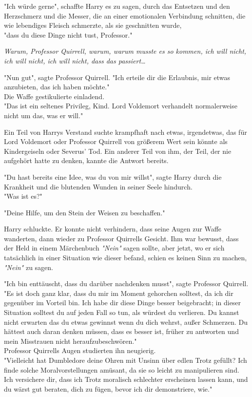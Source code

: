 {"Ich würde gerne", schaffte Harry es zu sagen, durch das Entsetzen und den Herzschmerz und die Messer, die an einer emotionalen Verbindung schnitten, die wie lebendiges Fleisch schmerzte, als sie geschnitten wurde,\\ "dass du diese Dinge nicht tust, Professor."

\emph{Warum, Professor Quirrell, warum, warum musste es so kommen, ich will nicht, ich will nicht, ich will nicht, dass das passiert…}

"Nun gut", sagte Professor Quirrell. "Ich erteile dir die Erlaubnis, mir etwas anzubieten, das ich haben möchte."\\ Die Waffe gestikulierte einladend.\\ "Das ist ein seltenes Privileg, Kind. Lord Voldemort verhandelt normalerweise nicht um das, was er will."

Ein Teil von Harrys Verstand suchte krampfhaft nach etwas, irgendetwas, das für Lord Voldemort oder Professor Quirrell von größerem Wert sein könnte als Kindergeiseln oder Severus' Tod. Ein anderer Teil von ihm, der Teil, der nie aufgehört hatte zu denken, kannte die Antwort bereits.

"Du hast bereits eine Idee, was du von mir willst", sagte Harry durch die Krankheit und die blutenden Wunden in seiner Seele hindurch.\\ "Was ist es?"

"Deine Hilfe, um den Stein der Weisen zu beschaffen."

Harry schluckte. Er konnte nicht verhindern, dass seine Augen zur Waffe wanderten, dann wieder zu Professor Quirrells Gesicht. Ihm war bewusst, dass der Held in einem Märchenbuch \emph{"Nein"} sagen sollte, aber jetzt, wo er sich tatsächlich in einer Situation wie dieser befand, schien es keinen Sinn zu machen, \emph{"Nein"} zu sagen.

"Ich bin enttäuscht, dass du darüber nachdenken musst", sagte Professor Quirrell.\\ "Es ist doch ganz klar, dass du mir im Moment gehorchen solltest, da ich dir gegenüber im Vorteil bin. Ich habe dir diese Dinge besser beigebracht; in dieser Situation solltest du auf jeden Fall so tun, als würdest du verlieren. Du kannst nicht erwarten das du etwas gewinnst wenn du dich wehrst, außer Schmerzen. Du hättest auch daran denken müssen, dass es besser ist, früher zu antworten und mein Misstrauen nicht heraufzubeschwören."\\ Professor Quirrells Augen studierten ihn neugierig.\\ "Vielleicht hat Dumbledore deine Ohren mit Unsinn über edlen Trotz gefüllt? Ich finde solche Moralvorstellungen amüsant, da sie so leicht zu manipulieren sind. Ich versichere dir, dass ich Trotz moralisch schlechter erscheinen lassen kann, und du wärst gut beraten, dich zu fügen, bevor ich dir demonstriere, wie."

}
